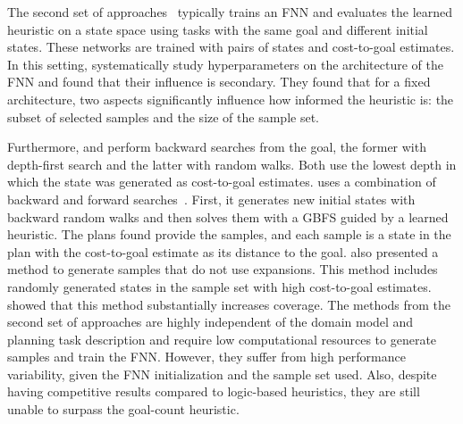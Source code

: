 The second set of approaches~\cite{Ferber.etal/2020a, Yu.etal/2020, Ferber.etal/2022, OToole/2022} typically trains an FNN and evaluates the learned heuristic on a state space using tasks with the same goal and different initial states. 
These networks are trained with pairs of states and cost-to-goal estimates. 
In this setting, \citeyear{Ferber.etal/2020a} systematically study hyperparameters on the architecture of the FNN and found that their influence is secondary. They found that for a fixed architecture, two aspects significantly influence how informed the heuristic is: the subset of selected samples and the size of the sample set. 

Furthermore, \citeyear{Yu.etal/2020} and \citeyear{OToole/2022} perform backward searches from the goal, the former with depth-first search and the latter with random walks. Both use the lowest depth in which the state was generated as cost-to-goal estimates. \citeyear{Ferber.etal/2022} uses a combination of backward and forward searches~\cite{Arfaee.etal/2011}. First, it generates new initial states with backward random walks and then solves them with a GBFS guided by a learned heuristic. The plans found provide the samples, and each sample is a state in the plan with the cost-to-goal estimate as its distance to the goal.
\citeyear{OToole/2022} also presented a method to generate samples that do not use expansions. This method includes randomly generated states in the sample set with high cost-to-goal estimates.
\citeyear{OToole/2022} showed that this method substantially increases coverage. 
The methods from the second set of approaches are highly independent of the domain model and planning task description and require low computational resources to generate samples and train the FNN. However, they suffer from high performance variability, given the FNN initialization and the sample set used. Also, despite having competitive results compared to logic-based heuristics, they are still unable to surpass the goal-count heuristic.
